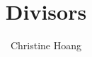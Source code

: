 \documentclass{article}
\title{Divisors}
\author{Christine Hoang}
\begin{document}
\maketitle

\section{}
\end{document}
